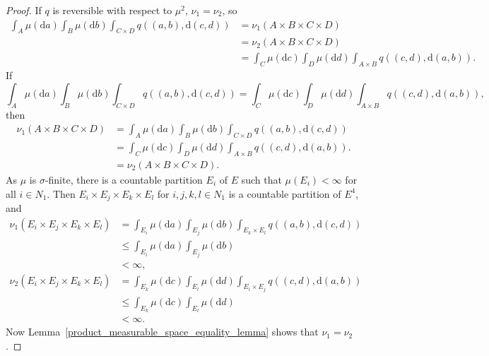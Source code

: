 \documentclass[english,twoside,openright]{HYgraduMLDS}
\newcommand{\dx}{\mathrm{d}}
\begin{document}
\begin{proof}
	If \(q\) is reversible with respect to \(\mu^{2}\), \(\nu_{1} = \nu_{2}\), so
  \begin{align*}
    \int_{A}\mu(\dx a)\int_{B}\mu(\dx b)\int_{C\times D}q((a, b), \dx(c, d))
    &= \nu_{1}(A\times B\times C\times D)
    \\&= \nu_{2}(A\times B\times C\times D)
    \\&= \int_{C}\mu(\dx c)\int_{D}\mu(\dx d)\int_{A\times B}q((c, d), \dx(a, b)).
  \end{align*}
  If
  \[
    \int_{A}\mu(\dx a)\int_{B}\mu(\dx b)\int_{C\times D}q((a, b), \dx(c, d))
    = \int_{C}\mu(\dx c)\int_{D}\mu(\dx d)\int_{A\times B}q((c, d), \dx(a, b)),
  \]
  then
  \begin{align*}
    \nu_{1}(A\times B\times C\times D)
    &= \int_{A}\mu(\dx a)\int_{B}\mu(\dx b)\int_{C\times D}q((a, b), \dx(c, d))
    \\&= \int_{C}\mu(\dx c)\int_{D}\mu(\dx d)\int_{A\times B}q((c, d), \dx(a, b)).
    \\&= \nu_{2}(A\times B\times C\times D).
  \end{align*}
  As \(\mu\) is \(\sigma\)-finite, there is a countable partition \(E_{i}\) of \(E\)
  such that \(\mu(E_{i}) < \infty\) for all \(i\in N_{1}\). Then
  \(E_{i}\times E_{j}\times E_{k}\times E_{l}\) for \(i, j, k, l\in N_{1}\) is a
  countable partition of \(E^{4}\), and
  \begin{align*}
    \nu_{1}(E_{i}\times E_{j}\times E_{k}\times E_{l})
    &= \int_{E_{i}}\mu(\dx a)\int_{E_{j}}\mu(\dx b)\int_{E_{k}\times E_{l}}q((a, b), \dx(c,d))
    \\&\leq \int_{E_{i}}\mu(\dx a)\int_{E_{j}}\mu(\dx b)
    \\&< \infty,
  \end{align*}
  \begin{align*}
    \nu_{2}(E_{i}\times E_{j}\times E_{k}\times E_{l})
    &= \int_{E_{k}}\mu(\dx c)\int_{E_{l}}\mu(\dx d)\int_{E_{i}\times E_{j}}q((c, d), \dx(a,b))
    \\&\leq \int_{E_{k}}\mu(\dx c)\int_{E_{l}}\mu(\dx d)
    \\&< \infty.
  \end{align*}
  Now Lemma~\ref{product_measurable_space_equality_lemma} shows that
  \(\nu_{1} = \nu_{2}\).
\end{proof}
\end{document}
